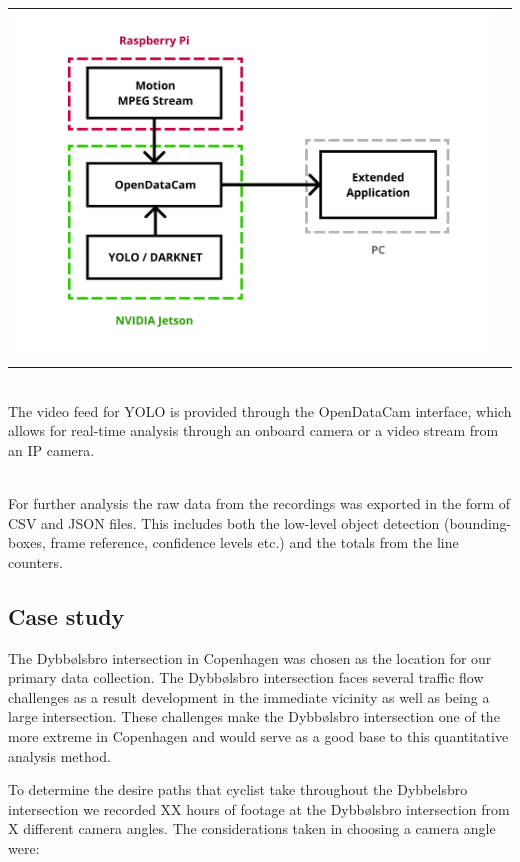 \documentclass[
10pt, %
a4paper, %
oneside, %
headinclude,footinclude, %
] {book}%
\begin{document}
\raggedbottom
\noindent
\begin{tabular}{@{}cc}
\includegraphics[width=1.0\columnwidth]{system} 
\end{tabular}
\label{system}

\ \\
The video feed for YOLO is provided through the OpenDataCam interface, which allows for real-time analysis through an onboard camera
or a video stream from an IP camera. 

\ \\
For further analysis the raw data from the recordings was exported in the form of CSV and JSON files. This includes both the low-level
object detection (bounding-boxes, frame reference, confidence levels etc.) and the totals from the line counters.

\subsection{Case study}
The Dybbølsbro intersection in Copenhagen was chosen as the location for our primary data collection. 
The Dybbølsbro intersection faces several traffic flow challenges as a result development in the immediate vicinity as well as being a large intersection.
These challenges make the Dybbølsbro intersection one of the more extreme in Copenhagen and would serve as a good base to this quantitative analysis method. 

To determine the desire paths that cyclist take throughout the Dybbelsbro intersection we recorded XX hours of footage 
at the Dybbølsbro intersection from X different camera angles.
The considerations taken in choosing a camera angle were:
\end{document}
